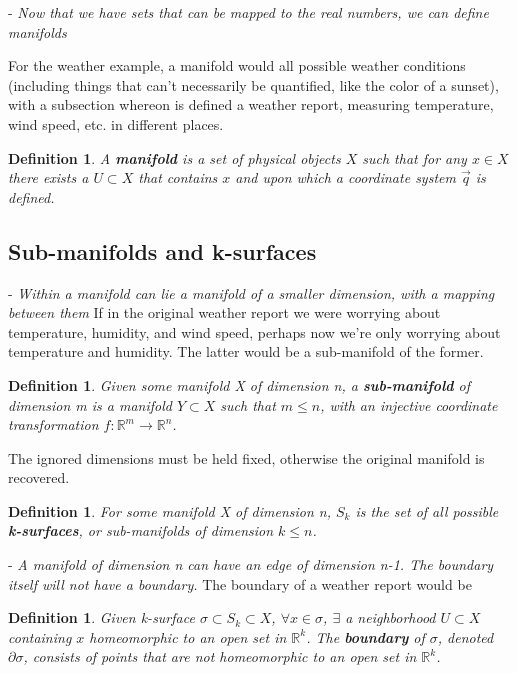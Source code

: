 \documentclass{book}
\newtheorem{defn}[equation]{Definition}
\begin{document}
- \emph{Now that we have sets that can be mapped to the real numbers, we can define manifolds}

For the weather example, a manifold would all possible weather conditions (including things that can't necessarily be quantified, like the color of a sunset), with a subsection whereon is defined a weather report, measuring temperature, wind speed, etc. in different places. 
 
\begin{defn}
	A \textbf{manifold} is a set of physical objects $X$ such that for any $x \in X$ there exists a $U \subset X$ that contains $x$ and upon which a coordinate system $\vec{q}$ is defined.
\end{defn}




\subsection{Sub-manifolds and k-surfaces}

- \emph{Within a manifold can lie a manifold of a smaller dimension, with a mapping between them}
If in the original weather report we were worrying about temperature, humidity, and wind speed, perhaps now we're only worrying about temperature and humidity. The latter would be a sub-manifold of the former. 

\begin{defn}
	Given some manifold X of dimension n, a \textbf{sub-manifold} of dimension m is a manifold $Y \subset X$ such that $m \leq n$, with an injective coordinate transformation $f: \mathbb{R}^m \to \mathbb{R}^n$. 
\end{defn}
The ignored dimensions must be held fixed, otherwise the original manifold is recovered. 

\begin{defn}
	For some manifold X of dimension n, $S_k$ is the set of all possible \textbf{k-surfaces}, or sub-manifolds of dimension $k \leq n$. 
\end{defn}

- \emph{A manifold of dimension n can have an edge of dimension n-1. The boundary itself will not have a boundary.}
The boundary of a weather report would be 

\begin{defn}
	Given k-surface $\sigma \subset S_k \subset X$, $\forall x \in \sigma$, $\exists$ a neighborhood $U \subset X$ containing $x$ homeomorphic to an open set in $\mathbb{R}^k$. The \textbf{boundary} of $\sigma$, denoted $\partial\sigma$, consists of points that are not homeomorphic to an open set in $\mathbb{R}^k$. 
\end{defn}
\end{document}
